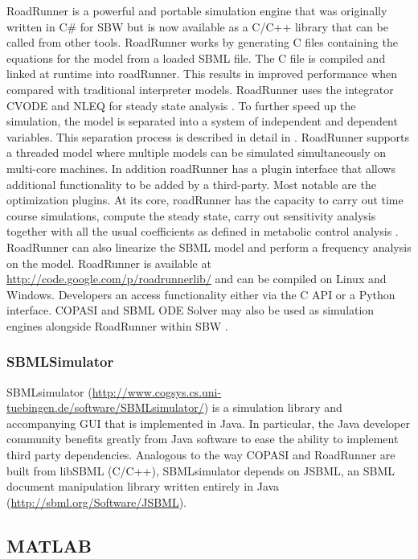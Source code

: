 RoadRunner is a powerful and portable simulation engine that was
originally written in C\# for SBW but is now available as a C/C++
library that can be called from other tools. RoadRunner works by
generating C files containing the equations for the model from a loaded
SBML file. The C file is compiled and linked at runtime into roadRunner.
This results in improved performance when compared with traditional
interpreter models. RoadRunner uses the integrator CVODE and NLEQ for
steady state analysis \autocite{cohen1996cvode}. To further speed up the
simulation, the model is separated into a system of independent and
dependent variables. This separation process is described in detail in
\autocite{vallabhajosyula2006conservation}. RoadRunner supports a
threaded model where multiple models can be simulated simultaneously on
multi-core machines. In addition roadRunner has a plugin interface that
allows additional functionality to be added by a third-party. Most
notable are the optimization plugins. At its core, roadRunner has the
capacity to carry out time course simulations, compute the steady state,
carry out sensitivity analysis together with all the usual coefficients
as defined in metabolic control analysis \autocite{hofmeyr-nutshell}.
RoadRunner can also linearize the SBML model and perform a frequency
analysis on the model. RoadRunner is available at
\url{http://code.google.com/p/roadrunnerlib/} and can be compiled on
Linux and Windows. Developers an access functionality either via the C
API or a Python interface. COPASI and SBML ODE Solver may also be used
as simulation engines alongside RoadRunner within SBW
\autocite{bergmann2008comparing}.

\subsubsection{SBMLSimulator}

SBMLsimulator
(\url{http://www.cogsys.cs.uni-tuebingen.de/software/SBMLsimulator/})
\autocite{drager2011jsbml} is a simulation library and accompanying GUI
that is implemented in Java. In particular, the Java developer community
benefits greatly from Java software to ease the ability to implement
third party dependencies. Analogous to the way COPASI and RoadRunner are
built from libSBML (C/C++), SBMLsimulator depends on JSBML, an SBML
document manipulation library written entirely in Java
(\url{http://sbml.org/Software/JSBML}).

\subsection{MATLAB}

